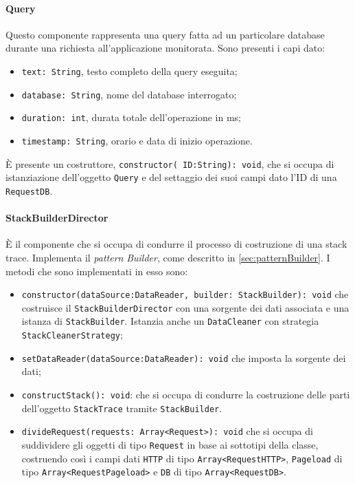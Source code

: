 \paragraph{Query} \Spazio
Questo componente rappresenta una query fatta ad un particolare database durante una richiesta all'applicazione monitorata. Sono presenti i capi dato:
\begin{itemize}
	\item \texttt{text: String},  testo completo della query eseguita;
	\item \texttt{database: String}, nome del database interrogato;
	\item \texttt{duration: int}, durata totale dell'operazione in ms;
	\item \texttt{timestamp: String}, orario e data di inizio operazione.
\end{itemize}
È presente un costruttore, \texttt{constructor( ID:String): void}, che si occupa di istanziazione dell'oggetto \texttt{Query} e del settaggio dei suoi campi dato l'ID di una \texttt{RequestDB}.

\paragraph{StackBuilderDirector} \Spazio
È il componente che si occupa di condurre il processo di costruzione di una stack trace. Implementa il \emph{pattern} \emph{Builder}, come descritto in \ref{sec:patternBuilder}. 
I metodi che sono implementati in esso sono:
\begin{itemize}
	\item \texttt{constructor(dataSource:DataReader, builder: StackBuilder): void} che costruisce il \texttt{StackBuilderDirector} con una sorgente dei dati associata e una istanza di \texttt{StackBuilder}. Istanzia anche un \texttt{DataCleaner} con strategia \texttt{StackCleanerStrategy}; 
	\item \texttt{setDataReader(dataSource:DataReader): void} che imposta la sorgente dei dati; 
	\item \texttt{constructStack(): void}: che si occupa di condurre la costruzione delle parti dell'oggetto \texttt{StackTrace} tramite \texttt{StackBuilder}.
	\item \texttt{divideRequest(requests: Array<Request>): void} che si occupa di suddividere  gli oggetti di tipo \texttt{Request} in base ai sottotipi della classe, costruendo così i campi dati \texttt{HTTP} di tipo \texttt{Array<RequestHTTP>}, \texttt{Pageload} di tipo \texttt{Array<RequestPageload>} e \texttt{DB} di tipo \texttt{Array<RequestDB>}.
\end{itemize}

